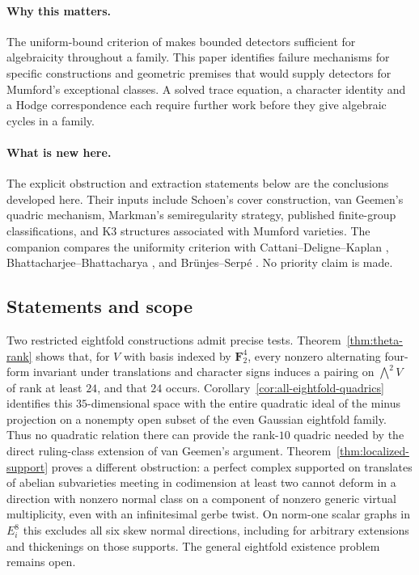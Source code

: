 \documentclass[11pt]{article}
\theoremstyle{definition}
\theoremstyle{remark}
\begin{document}
\paragraph{Why this matters.}
The uniform-bound criterion of \cite{CompanionA} makes bounded
detectors sufficient for algebraicity throughout a family. This
paper identifies failure mechanisms for specific constructions and
geometric premises that would supply detectors for Mumford's
exceptional classes. A solved trace equation, a character identity
and a Hodge correspondence each require further work before they give
algebraic cycles in a family.

\paragraph{What is new here.}
The explicit obstruction and extraction statements below are the
conclusions developed here. Their inputs include Schoen's cover
construction, van Geemen's quadric mechanism, Markman's
semiregularity strategy, published finite-group classifications,
and K3 structures associated with Mumford varieties.
The companion compares the uniformity criterion with
Cattani--Deligne--Kaplan \cite[p.~483]{CDK},
Bhattacharjee--Bhattacharya
\cite[Lemmas~4.2--4.3 and Theorem~4.5]{BBDense}, and
Br\"unjes--Serp\'e \cite[Theorem~3.4]{BS}.
No priority claim is made.

\subsection{Statements and scope}
Two restricted eightfold constructions admit precise tests. Theorem~\ref{thm:theta-rank} shows that, for $V$ with basis indexed by $\mathbf F_2^4$, every nonzero alternating four-form invariant under translations and character signs induces a pairing on $\bigwedge^2V$ of rank at least $24$, and that $24$ occurs. Corollary~\ref{cor:all-eightfold-quadrics} identifies this $35$-dimensional space with the entire quadratic ideal of the minus projection on a nonempty open subset of the even Gaussian eightfold family. Thus no quadratic relation there can provide the rank-$10$ quadric needed by the direct ruling-class extension of van Geemen's argument. Theorem~\ref{thm:localized-support} proves a different obstruction: a perfect complex supported on translates of abelian subvarieties meeting in codimension at least two cannot deform in a direction with nonzero normal class on a component of nonzero generic virtual multiplicity, even with an infinitesimal gerbe twist. On norm-one scalar graphs in $E_i^8$ this excludes all six skew normal directions, including for arbitrary extensions and thickenings on those supports. The general eightfold existence problem remains open.
\end{document}
